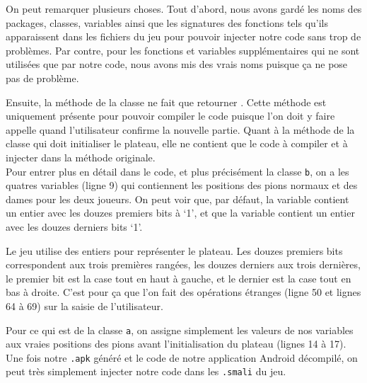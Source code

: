 On peut remarquer plusieurs choses. Tout d'abord, nous avons gardé les noms des packages, classes, variables ainsi que les signatures des fonctions tels qu'ils apparaissent dans les fichiers  du jeu pour pouvoir injecter notre code sans trop de problèmes. Par contre, pour les fonctions et variables supplémentaires qui ne sont utilisées que par notre code, nous avons mis des vrais noms puisque ça ne pose pas de problème.

Ensuite, la méthode  de la classe  ne fait que retourner . Cette méthode est uniquement présente pour pouvoir compiler le code puisque l'on doit y faire appelle quand l'utilisateur confirme la nouvelle partie. Quant à la méthode  de la classe  qui doit initialiser le plateau, elle ne contient que le code à compiler et à injecter dans la méthode originale.\\

Pour entrer plus en détail dans le code, et plus précisément la classe \texttt{b}, on a les quatres variables  (ligne 9) qui contiennent les positions des pions normaux et des dames pour les deux joueurs. On peut voir que, par défaut, la variable  contient un entier avec les douzes premiers bits à `1', et que la variable  contient un entier avec les douzes derniers bits `1'.

Le jeu utilise des entiers pour représenter le plateau. Les douzes premiers bits correspondent aux trois premières rangées, les douzes derniers aux trois dernières, le premier bit est la case tout en haut à gauche, et le dernier est la case tout en bas à droite. C'est pour ça que l'on fait des opérations étranges (ligne 50 et lignes 64 à 69) sur la saisie de l'utilisateur.

Pour ce qui est de la classe \texttt{a}, on assigne simplement les valeurs de nos variables aux vraies positions des pions avant l'initialisation du plateau (lignes 14 à 17).\\

Une fois notre \texttt{.apk} généré et le code de notre application Android décompilé, on peut très simplement injecter notre code dans les \texttt{.smali} du jeu.\\

